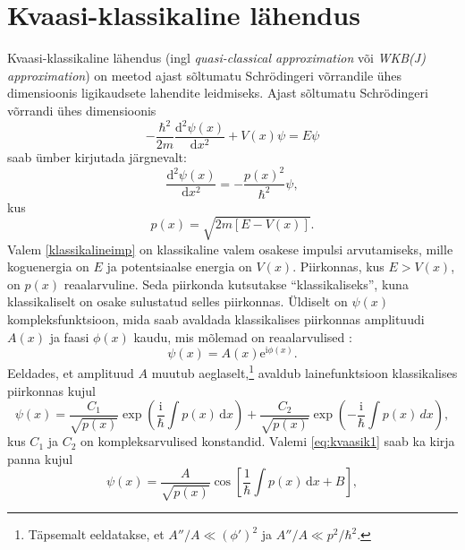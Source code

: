\documentclass{trkut}%
\begin{document}
\section{Kvaasi-klassikaline lähendus}
Kvaasi-klassikaline lähendus (ingl \textit{quasi-classical approximation} või \textit{WKB(J) approximation}) on meetod ajast sõltumatu Schrödingeri võrrandile ühes dimensioonis ligikaudsete lahendite leidmiseks.
Ajast sõltumatu Schrödingeri võrrandi ühes dimensioonis
\begin{equation}
    -\frac{\hbar^2}{2m}\frac{\mathrm{d}^2\psi(x)}{\mathrm{d}x^2}+V(x)\psi=E\psi
\end{equation}
saab ümber kirjutada järgnevalt:
\begin{equation}
    \frac{\mathrm{d}^2 \psi(x)}{\mathrm{d}x^2}= - \frac{p(x)^2}{\hbar^2}\psi,
\end{equation}
kus
\begin{equation} \label{klassikalineimp}
    p(x) = \sqrt{2m[E-V(x)]}.
\end{equation}
Valem \eqref{klassikalineimp} on klassikaline valem osakese impulsi arvutamiseks, mille koguenergia on $E$ ja potentsiaalse energia on $V(x)$.
Piirkonnas, kus $E>V(x)$, on $p(x)$ reaalarvuline.
Seda piirkonda kutsutakse \enquote{klassikaliseks}, kuna klassikaliselt on osake sulustatud selles piirkonnas.
Üldiselt on $\psi (x)$ kompleksfunktsioon, mida saab avaldada klassikalises piirkonnas amplituudi $A(x)$ ja faasi $\phi(x)$ kaudu, mis mõlemad on reaalarvulised \parencite[316]{griffiths05}:
\begin{equation}
    \psi(x)=A(x)\mathrm{e}^{\mathrm{i}\phi(x)}.
\end{equation}
Eeldades, et amplituud $A$ muutub aeglaselt,\footnote{Täpsemalt eeldatakse, et $A''/A\ll(\phi ')^2$ ja $A''/A\ll p^2/\hbar^2$.} avaldub lainefunktsioon klassikalises piirkonnas kujul \parencite[316-318]{griffiths05}
\begin{equation}
    \psi(x) = \frac{C_1}{\sqrt{p(x)}}\exp\left(\frac{\mathrm{i}}{\hbar}\int p(x)\, \mathrm{d}x\right) +\frac{C_2}{\sqrt{p(x)}}\exp\left(-\frac{\mathrm{i}}{\hbar}\int p(x)\, dx\right),
    \label{eq:kvaasik1}
\end{equation}
kus $C_1$ ja $C_2$ on kompleksarvulised konstandid.
Valemi \eqref{eq:kvaasik1} saab ka kirja panna kujul \parencite[446]{shankar94}
\begin{equation}
    \psi(x)=\frac{A}{\sqrt{p(x)}} \cos \left[ \frac{1}{\hbar}\int p(x)\, \mathrm{d}x + B \right],
    \label{eq:kvaasik2}
\end{equation}
\end{document}
